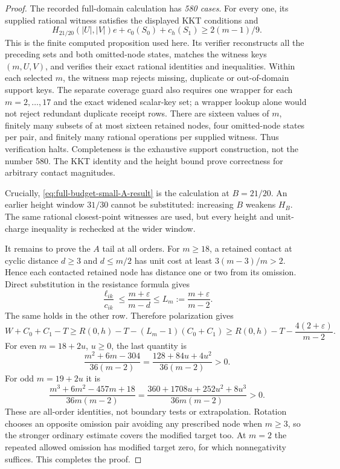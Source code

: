 \documentclass[11pt]{article}
\theoremstyle{remark}\newtheorem{remark}[theorem]{Remark}
\begin{document}
\begin{proof}
The recorded full-domain calculation has \emph{580 cases}. For every
one, its supplied rational witness satisfies the displayed KKT
conditions and
\begin{equation}\label{eq:full-budget-small-A-result}
 H_{21/20}(|U|,|V|)e+c_0(S_0)+c_h(S_1)\ge2(m-1)/9.
\end{equation}
This is the finite computed proposition used here. Its verifier
reconstructs all the preceding sets and both omitted-node states,
matches the witness keys $(m,U,V)$, and verifies their exact rational
identities and inequalities. Within each selected $m$, the witness
map rejects missing, duplicate or out-of-domain support keys. The
separate coverage guard also requires one wrapper for each
$m=2,\ldots,17$ and the exact widened scalar-key set; a wrapper
lookup alone would not reject redundant duplicate receipt rows.
There are sixteen values of $m$, finitely
many subsets of at most sixteen retained nodes, four omitted-node
states per pair, and finitely many rational operations per supplied
witness. Thus verification halts. Completeness is the exhaustive
support construction, not the number 580. The KKT identity and the
height bound prove correctness for arbitrary contact magnitudes.

Crucially, \eqref{eq:full-budget-small-A-result} is the calculation
at $B=21/20$. An earlier height window $31/30$ cannot be substituted:
increasing $B$ weakens $H_B$. The same rational closest-point
witnesses are used, but every height and unit-charge inequality is
rechecked at the wider window.

It remains to prove the $A$ tail at all orders. For $m\ge18$, a
retained contact at cyclic distance $d\ge3$ and $d\le m/2$ has
unit cost at least $3(m-3)/m>2$. Hence each contacted retained node
has distance one or two from its omission. Direct substitution in
the resistance formula gives
\[
 \frac{\ell_{ik}}{c_{ik}}
 \le\frac{m+\varepsilon}{m-d}
 \le L_m:=\frac{m+\varepsilon}{m-2}.
\]
The same holds in the other row. Therefore polarization gives
\[
 W+C_0+C_1-T
 \ge R(0,h)-T-(L_m-1)(C_0+C_1)
 \ge R(0,h)-T-\frac{4(2+\varepsilon)}{m-2}.
\]
For even $m=18+2u$, $u\ge0$, the last quantity is
\[
 \frac{m^2+6m-304}{36(m-2)}
 =\frac{128+84u+4u^2}{36(m-2)}>0.
\]
For odd $m=19+2u$ it is
\[
 \frac{m^3+6m^2-457m+18}{36m(m-2)}
 =\frac{360+1708u+252u^2+8u^3}{36m(m-2)}>0.
\]
These are all-order identities, not boundary tests or extrapolation.
Rotation chooses an opposite omission pair avoiding any prescribed
node when $m\ge3$, so the stronger ordinary estimate covers the
modified target too. At $m=2$ the repeated allowed omission has
modified target zero, for which nonnegativity suffices. This
completes the proof.
\end{proof}
\end{document}
